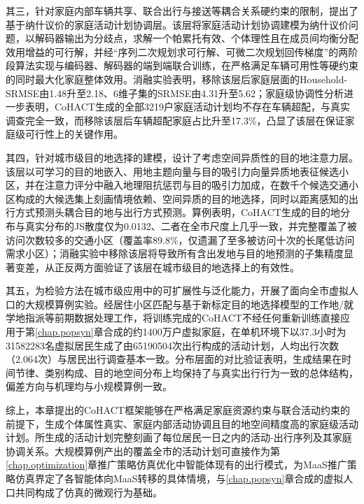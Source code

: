 其三，针对家庭内部车辆共享、联合出行与接送等耦合关系硬约束的限制，提出了基于纳什议价的家庭活动计划协调层。该层将家庭活动计划协调建模为纳什议价问题，以解码器输出为分歧点，求解一个帕累托有效、个体理性且在成员间均衡分配效用增益的可行解，并经``序列二次规划求可行解、可微二次规划回传梯度''的两阶段算法实现与编码器、解码器的端到端联合训练，在严格满足车辆可用性等硬约束的同时最大化家庭整体效用。消融实验表明，移除该层后家庭层面的Household-SRMSE由1.48升至2.18、6维子集的SRMSE由4.31升至5.62；家庭级协调性分析进一步表明，CoHACT生成的全部3219户家庭活动计划均不存在车辆超配，与真实调查完全一致，而移除该层后车辆超配家庭占比升至17.3\%，凸显了该层在保证家庭级可行性上的关键作用。

其四，针对城市级目的地选择的建模，设计了考虑空间异质性的目的地注意力层。该层以可学习的目的地嵌入、用地主题向量与目的吸引力向量异质地表征候选小区，并在注意力评分中融入地理阻抗惩罚与目的吸引力加成，在数千个候选交通小区构成的大候选集上刻画情境依赖、空间异质的目的地选择，同时以距离感知的出行方式预测头耦合目的地与出行方式预测。算例表明，CoHACT生成的目的地分布与真实分布的JS散度仅为0.0132、二者在全市尺度上几乎一致，并完整覆盖了被访问次数较多的交通小区（覆盖率89.8\%，仅遗漏了至多被访问十次的长尾低访问需求小区）；消融实验中移除该层将导致所有含出发地与目的地预测的子集精度显著变差，从正反两方面验证了该层在城市级目的地选择上的有效性。

其五，为检验方法在城市级应用中的可扩展性与泛化能力，开展了面向全市虚拟人口的大规模算例实验。经居住小区匹配与基于新标定目的地选择模型的工作地/就学地指派等前期数据处理工作，将训练完成的CoHACT不经任何重新训练直接应用于第\ref{chap.popsyn}章合成的约1400万户虚拟家庭，在单机环境下以37.3小时为31582283名虚拟居民生成了由65190504次出行构成的活动计划，人均出行次数（2.064次）与居民出行调查基本一致。分布层面的对比验证表明，生成结果在时间节律、类别构成、目的地空间分布上均保持了与真实出行行为一致的总体结构，偏差方向与机理均与小规模算例一致。

综上，本章提出的CoHACT框架能够在严格满足家庭资源约束与联合活动约束的前提下，生成个体属性真实、家庭内部活动协调且目的地空间精度高的家庭级活动计划。所生成的活动计划完整刻画了每位居民一日之内的活动-出行序列及其家庭协调关系。大规模算例产出的覆盖全市的活动计划可直接作为第\ref{chap.optimization}章推广策略仿真优化中智能体现有的出行模式，为MaaS推广策略仿真界定了各智能体向MaaS转移的具体情境，与\ref{chap.popsyn}章合成的虚拟人口共同构成了仿真的微观行为基础。
